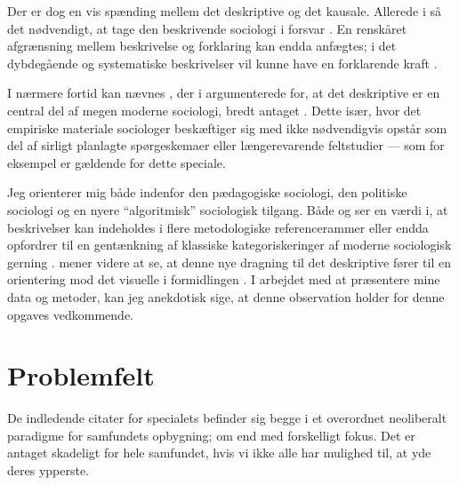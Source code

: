 Der er dog en vis spænding mellem det deskriptive og det kausale.
Allerede i \citeyear{sjobergRationaleDescriptiveSociology1951} så \citeauthor{sjobergRationaleDescriptiveSociology1951} det nødvendigt, at tage den beskrivende sociologi i forsvar \autocite{sjobergRationaleDescriptiveSociology1951}.
En renskåret afgrænsning mellem beskrivelse og forklaring kan endda anfægtes; i det dybdegående og systematiske beskrivelser vil kunne have en forklarende kraft \autocite[s. 252]{sjobergRationaleDescriptiveSociology1951}.

I nærmere fortid kan nævnes \citeauthor{savageContemporarySociologyChallenge2009}, der i \citeyear{savageContemporarySociologyChallenge2009} argumenterede for, at det deskriptive er en central del af megen moderne sociologi, bredt antaget \autocite{savageContemporarySociologyChallenge2009}.
Dette især, hvor det empiriske materiale sociologer beskæftiger sig med ikke nødvendigvis opstår som del af sirligt planlagte spørgeskemaer eller længerevarende feltstudier \autocite[s. 157]{savageContemporarySociologyChallenge2009} — som for eksempel er gældende for dette speciale.

Jeg orienterer mig både indenfor den pædagogiske sociologi, den politiske sociologi og en nyere “algoritmisk” sociologisk tilgang.
Både \citeauthor{sjobergRationaleDescriptiveSociology1951} og \citeauthor{savageContemporarySociologyChallenge2009} ser en værdi i, at beskrivelser kan indeholdes i flere metodologiske referencerammer \autocite[s. 256]{sjobergRationaleDescriptiveSociology1951} eller endda opfordrer til en gentænkning af klassiske kategoriskeringer af moderne sociologisk gerning \autocite[s. 170]{savageContemporarySociologyChallenge2009}.
\citeauthor{savageContemporarySociologyChallenge2009} mener videre at se, at denne nye dragning til det deskriptive fører til en orientering mod det visuelle i formidlingen \autocite[s.169]{savageContemporarySociologyChallenge2009}.
I arbejdet med at præsentere mine data og metoder, kan jeg anekdotisk sige, at denne observation holder for denne opgaves vedkommende.

\chapter{Problemfelt}\label{sec:problem}

De indledende citater for specialets befinder sig begge i et overordnet neoliberalt paradigme for samfundets opbygning; om end med forskelligt fokus.
Det er antaget skadeligt for hele samfundet, hvis vi ikke alle har mulighed til, at yde deres ypperste.

